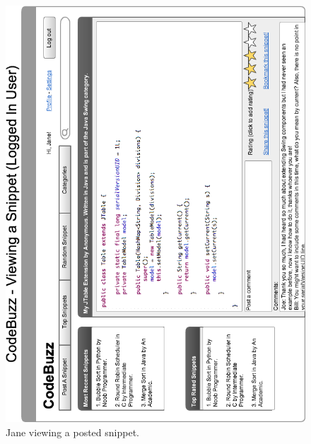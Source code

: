 \documentclass[11pt,a4paper]{article}
\begin{document}
\begin{figure}
\includegraphics[width=\textwidth]{../imgs/LoggedInViewSnippetHorz.png}
\caption{Jane viewing a posted snippet.}
\label{fig:LoggedInViewJane}
\end{figure}
\end{document}
